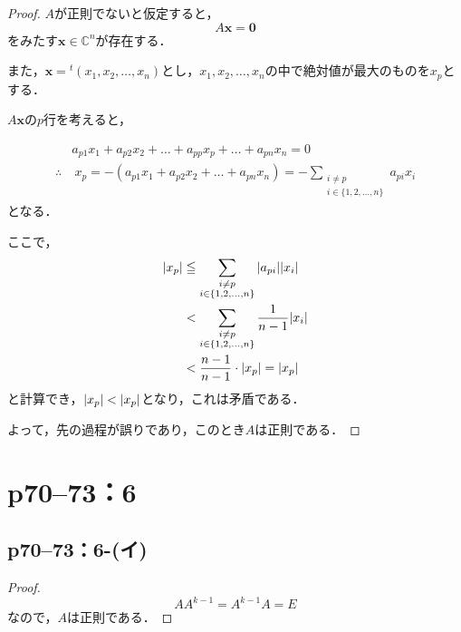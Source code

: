 \documentclass[a4paper,10pt,fleqn]{ltjsarticle}
\begin{document}
\begin{leftbar}
    \begin{proof}
        $A$が正則でないと仮定すると，
        \[
            A \bm{x} = \bm{0}
        \]
        をみたす$\bm{x} \in \mathbb{C}^n$が存在する．

        また，$\bm{x} ={} ^t (x_1,x_2,\dots,x_n)$とし，$x_1,x_2,\dots,x_n$の中で絶対値が最大のものを$x_p$とする．

        $A \bm{x}$の$p$行を考えると，

        \begin{align*}
                       & a_{p1} x_1 + a_{p2} x_2 + \dots + a_{pp} x_p + \dots + a_{pn} x_n = 0            \\
            \therefore & ~ x_p = -(a_{p1}x_1 + a_{p2} x_2+ \dots + a_{pn} x_n) =- \sum_{\substack{i \ne p \\ i \in \{1,2,\dots,n\}}} a_{pi} x_i
        \end{align*}
        となる．

        ここで，
        \begin{align*}
            \abs{x_p} & \leqq \sum_{\substack{i \ne p                \\ i \in \{1,2,\dots,n\}}} \abs{a_{pi}} \abs{x_i} \\
                      & < \sum_{\substack{i \ne p                    \\ i \in \{1,2,\dots,n\}}} \frac{1}{n-1} \abs{x_i} \\
                      & < \frac{n-1}{n-1} \cdot \abs{x_p} =\abs{x_p}
        \end{align*}
        と計算でき，$ \abs{x_p} < \abs{x_p}$となり，これは矛盾である．

        よって，先の過程が誤りであり，このとき$A$は正則である．
    \end{proof}
\end{leftbar}
\newpage

\section*{p70--73：6}

\subsection*{p70--73：6-(イ)}
\begin{tleftbar}
    \begin{proof}
        \[
            A A^{k-1} = A^{k-1} A = E
        \]
        なので，$A$は正則である．
    \end{proof}
\end{tleftbar}
\end{document}
